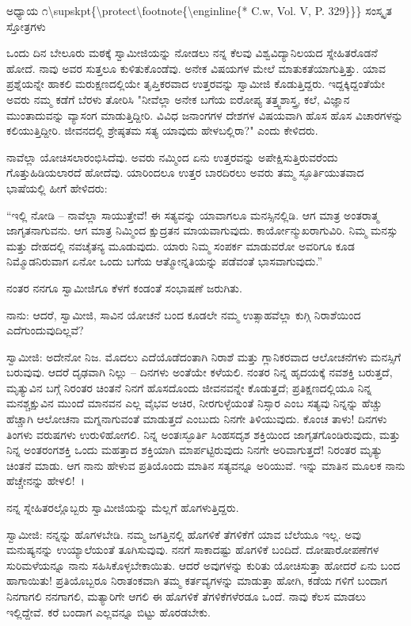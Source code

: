 
\num{ಅಧ್ಯಾಯ ೧\supskpt{\protect\footnote{\enginline{* C.w, Vol. V, P. 329}}}} ಸಂಸ್ಕೃತ ಸ್ತೋತ್ರಗಳು

ಒಂದು ದಿನ ಬೇಲೂರು ಮಠಕ್ಕೆ ಸ್ವಾಮೀಜಿಯನ್ನು ನೋಡಲು ನನ್ನ ಕೆಲವು ವಿಶ್ವವಿದ್ಯಾನಿಲಯದ ಸ್ನೇಹಿತರೊಡನೆ ಹೋದೆ. ನಾವು ಅವರ ಸುತ್ತಲೂ ಕುಳಿತುಕೊಂಡೆವು. ಅನೇಕ ವಿಷಯಗಳ ಮೇಲೆ ಮಾತುಕತೆಯಾಗುತ್ತಿತ್ತು. ಯಾವ ಪ್ರಶ್ನೆಯನ್ನೇ ಹಾಕಲಿ ಮರುಕ್ಷಣದಲ್ಲಿಯೇ ತೃಪ್ತಿಕರವಾದ ಉತ್ತರವನ್ನು ಸ್ವಾಮೀಜಿ ಕೊಡುತ್ತಿದ್ದರು. ಇದ್ದಕ್ಕಿದ್ದಂತೆಯೇ ಅವರು ನಮ್ಮ ಕಡೆಗೆ ಬೆರಳು ತೋರಿಸಿ "ನೀವೆಲ್ಲಾ ಅನೇಕ ಬಗೆಯ ಐರೋಪ್ಯ ತತ್ತ್ವಶಾಸ್ತ್ರ, ಕಲೆ, ವಿಜ್ಞಾನ ಮುಂತಾದುವನ್ನು ವ್ಯಾಸಂಗ ಮಾಡುತ್ತಿದ್ದೀರಿ. ವಿವಿಧ ಜನಾಂಗಗಳ ದೇಶಗಳ ವಿಷಯವಾಗಿ ಹೊಸ ಹೊಸ ವಿಚಾರಗಳನ್ನು ಕಲಿಯುತ್ತಿದ್ದೀರಿ. ಜೀವನದಲ್ಲಿ ಶ್ರೇಷ್ಠತಮ ಸತ್ಯ ಯಾವುದು ಹೇಳಬಲ್ಲಿರಾ?" ಎಂದು ಕೇಳಿದರು.

ನಾವೆಲ್ಲಾ ಯೋಚಿಸಲಾರಂಭಿಸಿದೆವು. ಅವರು ನಮ್ಮಿಂದ ಏನು ಉತ್ತರವನ್ನು ಅಪೇಕ್ಷಿಸುತ್ತಿರುವರೆಂದು ಗೊತ್ತುಹಿಡಿಯಲಾರದೆ ಹೋದೆವು. ಯಾರಿಂದಲೂ ಉತ್ತರ ಬಾರದಿರಲು ಅವರು ತಮ್ಮ ಸ್ಫೂರ್ತಿಯುತವಾದ ಭಾಷೆಯಲ್ಲಿ ಹೀಗೆ ಹೇಳಿದರು:

“ಇಲ್ಲಿ ನೋಡಿ – ನಾವೆಲ್ಲಾ ಸಾಯುತ್ತೇವೆ! ಈ ಸತ್ಯವನ್ನು ಯಾವಾಗಲೂ ಮನಸ್ಸಿನಲ್ಲಿಡಿ. ಆಗ ಮಾತ್ರ ಅಂತರಾತ್ಮ ಜಾಗೃತನಾಗುವನು. ಆಗ ಮಾತ್ರ ನಿಮ್ಮಿಂದ ಕ್ಷುದ್ರತನ ಮಾಯವಾಗುವುದು. ಕಾರ್ಯೋನ್ಮುಖರಾಗುವಿರಿ. ನಿಮ್ಮ ಮನಸ್ಸು ಮತ್ತು ದೇಹದಲ್ಲಿ ನವಚೈತನ್ಯ ಮೂಡುವುದು. ಯಾರು ನಿಮ್ಮ ಸಂಪರ್ಕ ಮಾಡುವರೋ ಅವರಿಗೂ ಕೂಡ ನಿಮ್ಮೊಡನಿರುವಾಗ ಏನೋ ಒಂದು ಬಗೆಯ ಆತ್ಮೋನ್ನತಿಯನ್ನು ಪಡೆವಂತೆ ಭಾಸವಾಗುವುದು.”

ನಂತರ ನನಗೂ ಸ್ವಾಮೀಜಿಗೂ ಕೆಳಗೆ ಕಂಡಂತೆ ಸಂಭಾಷಣೆ ಜರುಗಿತು.

ನಾನು: ಆದರೆ, ಸ್ವಾಮೀಜಿ, ಸಾವಿನ ಯೋಚನೆ ಬಂದ ಕೂಡಲೇ ನಮ್ಮ ಉತ್ಸಾಹವೆಲ್ಲಾ ಕುಗ್ಗಿ ನಿರಾಶೆಯಿಂದ ಎದೆಗುಂದುವುದಿಲ್ಲವೆ?

ಸ್ವಾಮೀಜಿ: ಅದೇನೋ ನಿಜ. ಮೊದಲು ಎದೆಯೊಡೆದಂತಾಗಿ ನಿರಾಶೆ ಮತ್ತು ಗ್ಲಾನಿಕರವಾದ ಆಲೋಚನೆಗಳು ಮನಸ್ಸಿಗೆ ಬರುವುವು. ಆದರೆ ದೃಢವಾಗಿ ನಿಲ್ಲು – ದಿನಗಳು ಅಂತೆಯೇ ಕಳೆಯಲಿ. ನಂತರ ನಿನ್ನ ಹೃದಯಕ್ಕೆ ನವಶಕ್ತಿ ಬರುತ್ತದೆ, ಮೃತ್ಯುವಿನ ಬಗ್ಗೆ ನಿರಂತರ ಚಿಂತನೆ ನಿನಗೆ ಹೊಸದೊಂದು ಜೀವನವನ್ನೇ ಕೊಡುತ್ತದೆ; ಪ್ರತಿಕ್ಷಣದಲ್ಲಿಯೂ ನಿನ್ನ ಮನಶ್ಚಕ್ಷುವಿನ ಮುಂದೆ ಮಾನವನ ಎಲ್ಲ ವೈಭವ ಅಚಿರ, ನೀರಗುಳ್ಳೆಯಂತೆ ನಿಸ್ಸಾರ ಎಂಬ ಸತ್ಯವು ನಿನ್ನನ್ನು ಹೆಚ್ಚು ಹೆಚ್ಚಾಗಿ ಆಲೋಚನಾ ಮಗ್ನನಾಗುವಂತೆ ಮಾಡುತ್ತದೆ ಎಂಬುದು ನಿನಗೇ ತಿಳಿಯುವುದು. ಕೊಂಚ ತಾಳು! ದಿನಗಳು ತಿಂಗಳು ವರುಷಗಳು ಉರುಳಿಹೋಗಲಿ. ನಿನ್ನ ಅಂತಃಸ್ಫೂರ್ತಿ ಸಿಂಹಸದೃಶ ಶಕ್ತಿಯಿಂದ ಜಾಗೃತಗೊಂಡಿರುವುದು, ಮತ್ತು ನಿನ್ನ ಅಂತರಂಗಶಕ್ತಿ ಒಂದು ಮಹತ್ತಾದ ಶಕ್ತಿಯಾಗಿ ಮಾರ್ಪಟ್ಟಿರುವುದು ನಿನಗೇ ಅರಿವಾಗುತ್ತದೆ! ನಿರಂತರ ಮೃತ್ಯು ಚಿಂತನೆ ಮಾಡು. ಆಗ ನಾನು ಹೇಳುವ ಪ್ರತಿಯೊಂದು ಮಾತಿನ ಸತ್ಯವನ್ನೂ ಅರಿಯುವೆ. ಇನ್ನು ಮಾತಿನ ಮೂಲಕ ನಾನು ಹೆಚ್ಚೇನನ್ನು ಹೇಳಲಿ!~।

ನನ್ನ ಸ್ನೇಹಿತರಲ್ಲೊಬ್ಬರು ಸ್ವಾಮೀಜಿಯನ್ನು ಮೆಲ್ಲಗೆ ಹೊಗಳುತ್ತಿದ್ದರು.

ಸ್ವಾಮೀಜಿ: ನನ್ನನ್ನು ಹೊಗಳಬೇಡಿ. ನಮ್ಮ ಜಗತ್ತಿನಲ್ಲಿ ಹೊಗಳಿಕೆ ತೆಗಳಿಕೆಗೆ ಯಾವ ಬೆಲೆಯೂ ಇಲ್ಲ. ಅವು ಮನುಷ್ಯನನ್ನು ಉಯ್ಯಾಲೆಯಂತೆ ತೂಗಿಸುವುವು. ನನಗೆ ಸಾಕಾದಷ್ಟು ಹೊಗಳಿಕೆ ಬಂದಿದೆ. ದೋಷಾರೋಪಣೆಗಳ ಸುರಿಮಳೆಯನ್ನೂ ನಾನು ಸಹಿಸಿಕೊಳ್ಳಬೇಕಾಯಿತು. ಆದರೆ ಅವುಗಳನ್ನು ಕುರಿತು ಯೋಚಿಸುತ್ತಾ ಹೋದರೆ ಏನು ಬಂದ ಹಾಗಾಯಿತು! ಪ್ರತಿಯೊಬ್ಬರೂ ನಿರಾತಂಕವಾಗಿ ತಮ್ಮ ಕರ್ತವ್ಯಗಳನ್ನು ಮಾಡುತ್ತಾ ಹೋಗಿ, ಕಡೆಯ ಗಳಿಗೆ ಬಂದಾಗ ನಿನಗಾಗಲಿ ನನಗಾಗಲಿ, ಮತ್ಯಾರಿಗೇ ಆಗಲಿ ಈ ಹೊಗಳಿಕೆ ತೆಗಳಿಕೆಗಳೆರಡೂ ಒಂದೆ. ನಾವು ಕೆಲಸ ಮಾಡಲು ಇಲ್ಲಿದ್ದೇವೆ. ಕರೆ ಬಂದಾಗ ಎಲ್ಲವನ್ನೂ ಬಿಟ್ಟು ಹೊರಡಬೇಕು.

